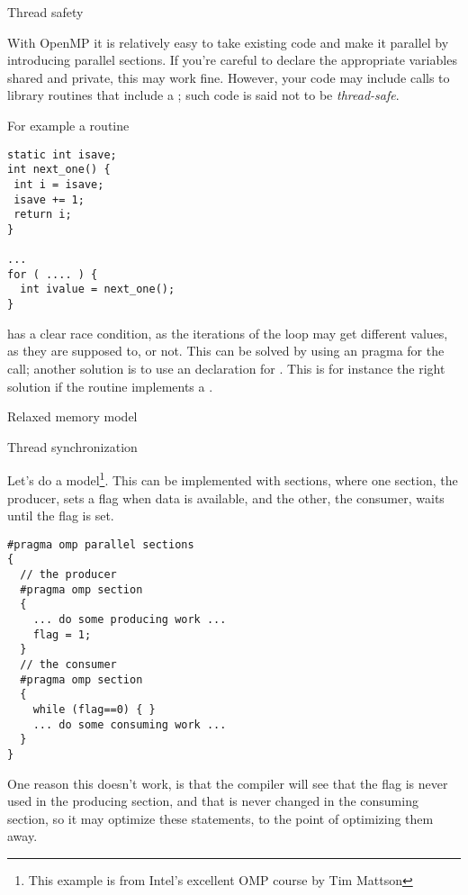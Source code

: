  {Thread safety}

With OpenMP it is relatively easy to take existing code and make
it parallel by introducing parallel sections. If you're careful
to declare the appropriate variables shared and private,
this may work fine. However, your code may include
calls to library routines that include a ;
such code is said not to be \emph{thread-safe}.

For example a routine
\begin{verbatim}
static int isave;
int next_one() {
 int i = isave;
 isave += 1;
 return i;
}

...
for ( .... ) {
  int ivalue = next_one();
}
\end{verbatim}
has a clear race condition, as the iterations of the loop
may get different  values, as they are supposed to,
or not. This can be solved by using an 
pragma for the  call; another solution 
is to use an  declaration for .
This is for instance the right solution if  the 
routine implements a .


 {Relaxed memory model}

 {Thread synchronization}

Let's do a  model\footnote{This example
  is from Intel's excellent OMP course by Tim Mattson}.  This can be
implemented with sections, where one section, the producer, sets a
flag when data is available, and the other, the consumer, waits until
the flag is set.
\begin{verbatim}
#pragma omp parallel sections
{
  // the producer
  #pragma omp section
  {
    ... do some producing work ...
    flag = 1;
  }
  // the consumer
  #pragma omp section
  {
    while (flag==0) { }
    ... do some consuming work ...
  }
}
\end{verbatim}
One reason this doesn't work, is that the compiler will see that the flag is never used
in the producing section, and that is never changed in the consuming section, so
it may optimize these statements, to the point of optimizing them away.

